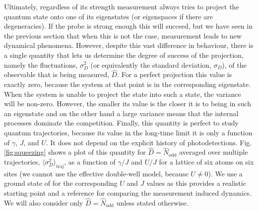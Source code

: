 Ultimately, regardless of its strength measurement always tries to
project the quantum state onto one of its eigenstates (or eigenspaces
if there are degeneracies). If the probe is strong enough this will
succeed, but we have seen in the previous section that when this is
not the case, measurement leads to new dynamical phenomena. However,
despite this vast difference in behaviour, there is a single quantity
that lets us determine the degree of success of the projection, namely
the fluctuations, $\sigma_D^2$ (or equivalently the standard
deviation, $\sigma_D$), of the observable that is being measured,
$\hat{D}$. For a perfect projection this value is exactly zero,
because the system at that point is in the corresponding
eigenstate. When the system is unable to project the state into such a
state, the variance will be non-zero. However, the smaller its value
is the closer it is to being in such an eigenstate and on the other
hand a large variance means that the internal processes dominate the
competition. Finally, this quantity is perfect to study quantum
trajectories, because its value in the long-time limit it is only a
function of $\gamma$, $J$, and $U$. It does not depend on the explicit
history of photodetections. Fig. \ref{fig:squeezing} shows a plot of
this quantity for $\hat{D} = \hat{N}_\mathrm{odd}$ averaged over
multiple trajectories, $\langle \sigma^2_D \rangle_\mathrm{traj}$, as
a function of $\gamma/J$ and $U/J$ for a lattice of six atoms on six
sites (we cannot use the effective double-well model, because
$U \ne 0$). We use a ground state of for the corresponding $U$ and $J$
values as this provides a realistic starting point and a reference for
comparing the measurement induced dynamics. We will also consider only
$\hat{D} = \hat{N}_\mathrm{odd}$ unless stated otherwise.

